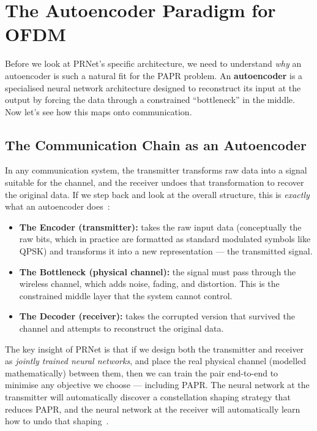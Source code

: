 \section{The Autoencoder Paradigm for OFDM}

Before we look at PRNet's specific architecture, we need to understand \emph{why} an autoencoder is such a natural fit for the PAPR problem. An \textbf{autoencoder} is a specialised neural network architecture designed to reconstruct its input at the output by forcing the data through a constrained ``bottleneck'' in the middle. Now let's see how this maps onto communication.


\subsection{The Communication Chain as an Autoencoder}

In any communication system, the transmitter transforms raw data into a signal suitable for the channel, and the receiver undoes that transformation to recover the original data.  If we step back and look at the overall structure, this is \emph{exactly} what an autoencoder does~\cite{kim2017novel}:

\begin{itemize}
    \item \textbf{The Encoder (transmitter):} takes the raw input data (conceptually the raw bits, which in practice are formatted as standard modulated symbols like QPSK) and transforms it into a new representation --- the transmitted signal.
    \item \textbf{The Bottleneck (physical channel):} the signal must pass through the wireless channel, which adds noise, fading, and distortion.  This is the constrained middle layer that the system cannot control.
    \item \textbf{The Decoder (receiver):} takes the corrupted version that survived the channel and attempts to reconstruct the original data.
\end{itemize}

The key insight of PRNet is that if we design both the transmitter and receiver as \emph{jointly trained neural networks}, and place the real physical channel (modelled mathematically) between them, then we can train the pair end-to-end to minimise any objective we choose --- including PAPR.  The neural network at the transmitter will automatically discover a constellation shaping strategy that reduces PAPR, and the neural network at the receiver will automatically learn how to undo that shaping~\cite{kim2017novel}.


